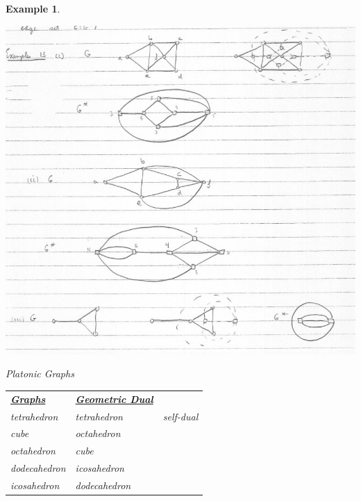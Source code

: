 \documentclass[12pt]{article}
\newtheorem{example}{Example}
\begin{document}
\begin{example}
	\begin{center}
		\includegraphics[scale=0.5]{dualgraph}
	\end{center}

	Platonic Graphs

	\begin{table}[H]
		\begin{center}
			\begin{tabular}{lll}
				\uline{\textbf{Graphs}} & \uline{\textbf{Geometric Dual}} &           \\
				tetrahedron             & tetrahedron                     & self-dual \\
				cube                    & octahedron                      &           \\
				octahedron              & cube                            &           \\
				dodecahedron            & icosahedron                     &           \\
				icosahedron             & dodecahedron                    &
			\end{tabular}
		\end{center}
	\end{table}

\end{example}
\end{document}
